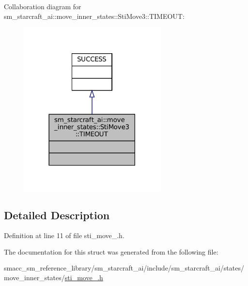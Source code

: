 Collaboration diagram for sm\+\_\+starcraft\+\_\+ai\+:\+:move\+\_\+inner\+\_\+states\+:\+:Sti\+Move3\+:\+:T\+I\+M\+E\+O\+UT\+:
\nopagebreak
\begin{figure}[H]
\begin{center}
\leavevmode
\includegraphics[width=213pt]{structsm__starcraft__ai_1_1move__inner__states_1_1StiMove3_1_1TIMEOUT__coll__graph}
\end{center}
\end{figure}


\subsection{Detailed Description}


Definition at line 11 of file sti\+\_\+move\+\_.\+h.



The documentation for this struct was generated from the following file\+:\begin{DoxyCompactItemize}
\item 
smacc\+\_\+sm\+\_\+reference\+\_\+library/sm\+\_\+starcraft\+\_\+ai/include/sm\+\_\+starcraft\+\_\+ai/states/move\+\_\+inner\+\_\+states/\hyperlink{sti__move__3_8h}{sti\+\_\+move\+\_.\+h}\end{DoxyCompactItemize}
